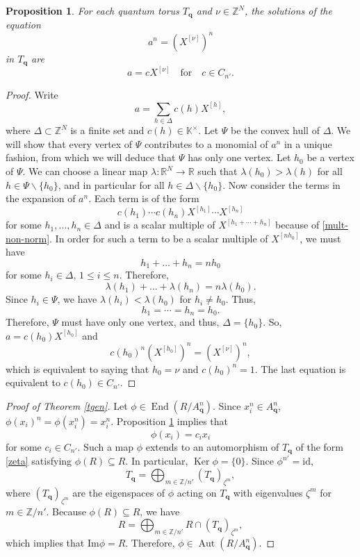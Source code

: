 \documentclass[11pt]{amsart}
\theoremstyle{plain}
\newtheorem{proposition}[theorem]{Proposition}
\newcommand \bpr[1] { \begin{proposition}\label{p#1} }
\newcommand {\epr} { \end{proposition} }
\newcommand \thref[1]{Theorem \ref{t#1}}
\newcommand \prref[1]{Proposition \ref{p#1}}
\def \KK {{\mathbb C}}
\def \KK {{\mathbb K}}
\def \Zset {{\mathbb Z}}
\def \id { {\mathrm{id}} }
\DeclareMathOperator \Aut { {\mathrm{Aut}} }
\DeclareMathOperator \Ker { {\mathrm{Ker}} }
\DeclareMathOperator \End { {\mathrm{End}} }
\renewcommand \Im { {\mathrm{Im}} }
\begin{document}
\bpr{main} For each quantum torus $T_{\mathbf{q}}$ and $\nu \in \Zset^N$, the 
solutions of the equation 
\[
a^n =(X^{[\nu]})^n
\]
in $T_{\mathbf{q}}$ are 
\[
a=cX^{[\nu]} \quad \mbox{for} \quad c \in C_{n'}.
\]
\epr
\begin{proof}
Write
\[
a=\sum_{h\in \Delta} c(h) X^{[h]},
\]
where $\Delta \subset \mathbb Z^N$ is a finite set and $c(h) \in \KK^\times$. Let $\Psi$ be the convex hull of $\Delta$. We will show that every vertex of $\Psi$ contributes to a monomial of $a^n$ in a unique fashion, from which we will deduce that $\Psi$ has only one vertex. Let $h_0$ be a vertex of $\Psi$. We can choose a linear map $\lambda : \mathbb R^N \rightarrow \mathbb R$ such that $\lambda(h_0)>\lambda (h)$ for all $h \in \Psi \backslash \{h_0 \}$, and in particular for all
$h\in \Delta \backslash \{h_0\}$. Now consider the terms in the expansion of $a^n$. Each term is of the form 
\[
c(h_1) \cdots c(h_n) X^{[h_1]} \cdots X^{[h_n]}
\]
for some $h_1, \ldots, h_n \in \Delta$ and 
is a scalar multiple of $X^{[h_1 + \cdots + h_n]}$ because of \eqref{mult-non-norm}.
In order for such a term to be a scalar multiple of $X^{[n h_0]}$,
we must have 
$$h_1+\dots + h_n = n h_0$$ 
for some $h_i \in \Delta$, $1\leq i \leq n$. 
Therefore,
$$\lambda(h_1)+\dots +\lambda(h_n) = n \lambda(h_0).$$
Since $h_i \in \Psi$, we have $\lambda(h_i) < \lambda (h_0)$ for $h_i \neq h_0$. Thus, 
$$h_1=\cdots=h_n = h_0.$$ 
Therefore, $\Psi$ must have only one vertex, and thus, $\Delta = \{ h_0 \}$. So, $a = c(h_0) X^{[h_0]}$ and 
$$c(h_0)^n(X^{[h_0]})^n =(X^{[\nu]})^n,$$
which is equivalent to saying that $h_0 = \nu$ and $c(h_0)^n =1$. The last equation is equivalent to $c(h_0) \in C_{n'}$.
\end{proof}
\begin{proof}[Proof of \thref{gen}] Let $\phi \in \End(R/A_{\mathbf{q}}^n)$. 
Since $x_i^n \in A_{\mathbf{q}}^n$, 
$\phi(x_i)^n=\phi(x_i^n) = x_i^n$. \prref{main} implies that 
$$\phi(x_i)=c_i x_i$$
for some $c_i \in C_{n'}$. Such a map $\phi$ extends to an automorphism of  $T_{\mathbf{q}}$ of the form \eqref{zeta} satisfying $\phi(R) \subseteq R$.
In particular, $\Ker \phi =\{0\}$. Since $\phi^{n'} = \id$, 
\[
T_{\mathbf{q}} = \bigoplus_{m \in \Zset/n'} (T_{\mathbf{q}})_{\zeta^m},
\]
where $(T_{\mathbf{q}})_{\zeta^m}$ 
are the eigenspaces of $\phi$ acting on $T_{\mathbf{q}}$ with eigenvalues $\zeta^m$ for $m \in \Zset/n'$.
Because $\phi(R) \subseteq R$, we have 
\[
R = \bigoplus_{m \in \Zset/n'} R \cap (T_{\mathbf{q}})_{\zeta^m},
\]
which implies that $\Im \phi  =R$. Therefore,  $\phi \in \Aut(R/A_{\mathbf{q}}^n)$.
\end{proof}
\end{document}
